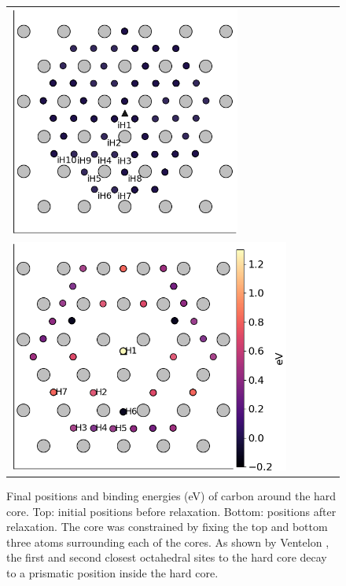 \documentclass[a4paper,11pt]{article}
\begin{document}
\begin{figure}	
    \begin{tabular}{l}
 	          \includegraphics[width=0.7\textwidth]{../Images/hard_core_fe_C_initial_positioning.png}  \\
 	          \includegraphics[width=0.85\textwidth]{../Images/hard_core_fe_C_positioning_energies_h7_label.png}  \\

     	     \end{tabular}		
\caption{ Final positions and binding energies (eV) of carbon around the hard core. Top: initial positions before relaxation. Bottom: positions after relaxation. The core was constrained by fixing the top and bottom three atoms surrounding each of the cores. As shown by Ventelon \cite{Ventelon2015}, the first and second closest octahedral sites to the hard core decay to a prismatic position inside the hard core. }
\label{hardbindingenergydist}
   \end{figure}
\end{document}
